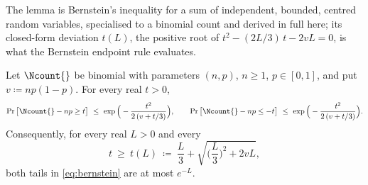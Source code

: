 
The lemma is Bernstein's inequality for a sum of independent, bounded,
centred random variables, specialised to a binomial count and derived in full
here; its closed-form deviation $t(L)$, the positive root of
$t^{2}-(2L/3)\,t-2vL=0$, is what the Bernstein endpoint rule evaluates.

\begin{lemma}\label{lem:bernstein-tail}
Let $\Ncount{}$ be binomial with parameters $(n,p)$, $n\ge1$, $p\in[0,1]$,
and put $v\coloneqq np(1-p)$. For every real $t>0$,
\begin{equation}\label{eq:bernstein}
  \Pr\big[\Ncount{}-np\ge t\big]\ \le\ \exp\Big(-\frac{t^{2}}{2\,(v+t/3)}\Big),
  \qquad
  \Pr\big[\Ncount{}-np\le -t\big]\ \le\ \exp\Big(-\frac{t^{2}}{2\,(v+t/3)}\Big).
\end{equation}
Consequently, for every real $L>0$ and every
\begin{equation}\label{eq:bernstein-t}
  t\ \ge\ t(L)\ \coloneqq\ \frac{L}{3}+\sqrt{\Big(\frac{L}{3}\Big)^{2}+2vL},
\end{equation}
both tails in \eqref{eq:bernstein} are at most $e^{-L}$.
\end{lemma}

